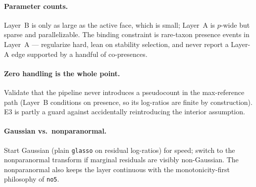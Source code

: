 \documentclass[11pt]{article}
\theoremstyle{definition}
\theoremstyle{plain}
\theoremstyle{remark}
\newcommand{\1}{\mathbf{1}}
\begin{document}
\paragraph{Parameter counts.} Layer~B is only as large as the active face, which
is small; Layer~A is $p$-wide but sparse and parallelizable. The binding
constraint is rare-taxon presence events in Layer~A --- regularize hard, lean on
stability selection, and never report a Layer-A edge supported by a handful of
co-presences.

\paragraph{Zero handling is the whole point.} Validate that the pipeline never
introduces a pseudocount in the max-reference path (Layer~B conditions on
presence, so its log-ratios are finite by construction). E3 is partly a guard
against accidentally reintroducing the interior assumption.

\paragraph{Gaussian vs.\ nonparanormal.} Start Gaussian (plain \texttt{glasso} on
residual log-ratios) for speed; switch to the nonparanormal transform if marginal
residuals are visibly non-Gaussian. The nonparanormal also keeps the layer
continuous with the monotonicity-first philosophy of \texttt{no5}.
\end{document}
